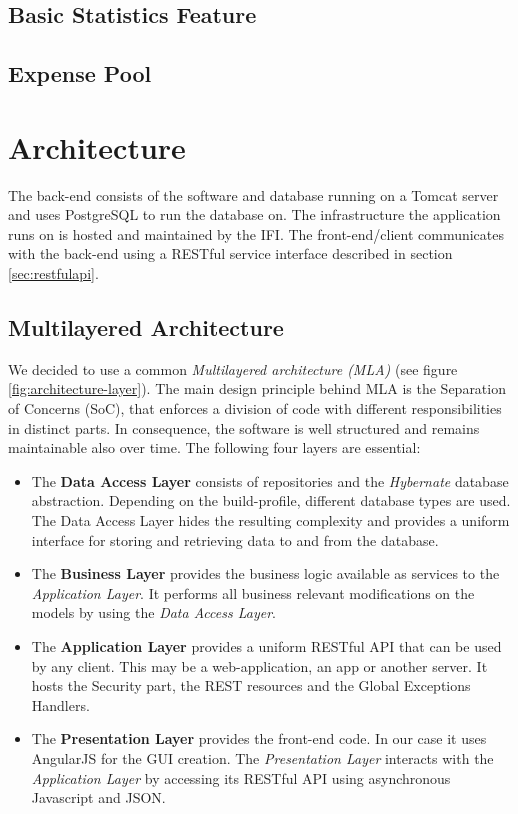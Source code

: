 \subsection{Basic Statistics Feature}
\subsection{Expense Pool}


\section{Architecture}

The back-end consists of the software and database running on a Tomcat \cite{tomcat} server and uses PostgreSQL \cite{postgresql} to run the database on. The infrastructure the application runs on is hosted and maintained by the IFI. The front-end/client communicates with the back-end using a RESTful service interface described in section \ref{sec:restfulapi}.

\subsection{Multilayered Architecture}
We decided to use a common \textit{Multilayered architecture (MLA)}\cite{mla} (see figure \ref{fig:architecture-layer}). The main design principle behind MLA is the Separation of Concerns (SoC), that enforces a division of code with different responsibilities in distinct parts. In consequence, the software is well structured and remains maintainable also over time. The following four layers are essential:
\begin{itemize}
	\item The \textbf{Data Access Layer} consists of repositories and the \textit{Hybernate} database abstraction. Depending on the build-profile, different database types are used. The Data Access Layer hides the resulting complexity and provides a uniform interface for storing and retrieving data to and from the database.
	\item The \textbf{Business Layer} provides the business logic available as services to the \textit{Application Layer}. It performs all business relevant modifications on the models by using the \textit{Data Access Layer}.	
	\item The \textbf{Application Layer} provides a uniform RESTful API that can be used by any client. This may be a web-application, an app or another server. It hosts the Security part, the REST resources and the Global Exceptions Handlers.
	\item The \textbf{Presentation Layer} provides the front-end code. In our case it uses AngularJS for the GUI creation. The \textit{Presentation Layer} interacts with the \textit{Application Layer} by accessing its RESTful API using asynchronous Javascript and JSON.
\end{itemize}

